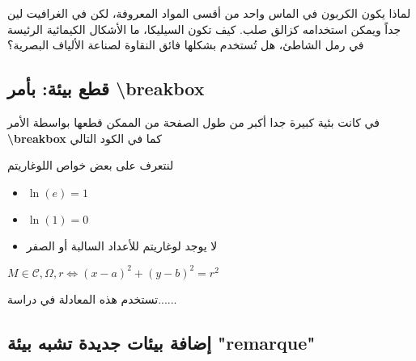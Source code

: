 \documentclass[12pt,a4paper]{mathbook_arabic}
\newcommand\ee{\textenglish}
\begin{document}
\begin{demonstration}[5]
  لماذا يكون الكربون في الماس واحد من أقسى المواد المعروفة، لكن في الغرافيت لين جداً ويمكن استخدامه كزالق صلب.
     كيف تكون السيليكا، ما الأشكال الكيمائية الرئيسة في رمل الشاطئ، هل تُستخدم 
     بشكلها فائق النقاوة لصناعة الألياف البصرية؟
\end{demonstration}



\subsection{ قطع بيئة: بأمر  \ee{ \textbackslash{breakbox}}}

 في كانت بئية كبيرة جدا أكبر من طول الصفحة من الممكن قطعها بواسطة الأمر
    \ee{\bf \textbackslash{breakbox}} كما في الكود التالي


 \begin{propriete}
لنتعرف على بعض خواص اللوغاريتم
\begin{itemize}
\item $\ln(e)=1$
\item $\ln(1)=0$
\item لا يوجد لوغاريتم للأعداد السالبة أو الصفر
\end{itemize}
\breakbox

$M\in\mathscr{C},{\Omega},{r} \Longleftrightarrow (x-a)^2+(y-b)^2=r^2
$\par
تستخدم هذه المعادلة في دراسة......
\end{propriete}





\subsection{ إضافة بيئات جديدة تشبه بيئة  \ee{"remarque"}}
\end{document}
